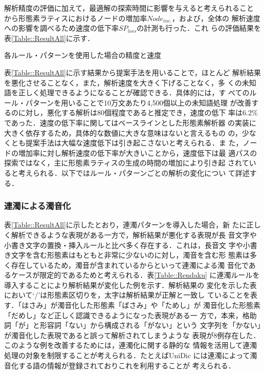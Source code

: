 \documentclass[japanese]{jnlp_1.4}
\begin{document}
  解析精度の評価に加えて，最適解の探索時間に影響を与えると考えられること
  から形態素ラティスにおけるノードの増加率$N\!ode_{inc.}$，および，全体の
  解析速度への影響を調べるため速度の低下率$SP_{loss}$の計測も行った．これ
  らの評価結果を表\ref{Table::ResultAll}に示す．
  
  \begin{table}[t]
    \caption{各ルール・パターンを使用した場合の精度と速度}
 \label{Table::ResultAll}

  \end{table}      

  表\ref{Table::ResultAll}に示す結果から提案手法を用いることで，ほとんど
  解析結果を悪化させることなく，また，解析速度を大きく下げることなく，多
  くの未知語を正しく処理できるようになることが確認できる．具体的には，す
  べてのルール・パターンを用いることで10万文あたり4,500個以上の未知語処理
  が改善するのに対し，悪化する解析は80個程度であると推定でき，速度の低下
  率は6.2\%であった．速度の低下率に関してはベースラインとした形態素解析器
  の実装に大きく依存するため，具体的な数値に大きな意味はないと言えるもの
  の，少なくとも提案手法は大幅な速度低下は引き起こさないと考えられる．ま
  た，ノードの増加率に対し解析速度の低下率が大きいことから，速度低下は最
  適パスの探索ではなく，主に形態素ラティスの生成の時間の増加により引き起
  されていると考えられる．以下ではルール・パターンごとの解析の変化につい
  て詳述する．


  \subsubsection{連濁による濁音化}

  表\ref{Table::ResultAll}に示したとおり，連濁パターンを導入した場合，新
  たに正しく解析できるような表現がある一方で，解析結果が悪化する表現が長
  音文字や小書き文字の置換・挿入ルールと比べ多く存在する．これは，長音文
  字や小書き文字を含む形態素はもともと非常に少ないのに対し，濁音を含む形
  態素は多く存在しているため，濁音が含まれているからといって連濁による濁
  音化であるケースが限定的であるためと考えられる．表\ref{Table::Rendaku}
  に連濁ルールを導入することにより解析結果が変化した例を示す．解析結果の
  変化を示した表において`/'は形態素区切りを，太字は解析結果が正解と一致し
  ていることを表す．「はさみ」が濁音化した形態素「ばさみ」や「ためし」が
  濁音化した形態素「だめし」など正しく認識できるようになった表現がある一
  方で，本来，格助詞「が」と形容詞「ない」から構成される「がない」という
  文字列を「かない」が濁音化した表現であると誤って解析されてしまうような
  表現が8例存在した．このような例を改善するためには，連濁化に関する静的な
  情報を活用して連濁処理の対象を制限することが考えられる．たとえばUniDic
  には連濁によって濁音化する語の情報が登録されておりこれを利用することが
  考えられる．
  
\end{document}
